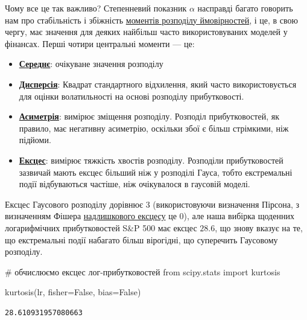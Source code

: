 \documentclass[
  letterpaper,
]{report}
\newenvironment{Shaded}{\begin{snugshade}}{\end{snugshade}}
\newcommand{\CommentTok}[1]{\textcolor[rgb]{0.37,0.37,0.37}{#1}}
\newcommand{\ImportTok}[1]{\textcolor[rgb]{0.00,0.46,0.62}{#1}}
\newcommand{\NormalTok}[1]{\textcolor[rgb]{0.00,0.23,0.31}{#1}}
\newcommand{\OperatorTok}[1]{\textcolor[rgb]{0.37,0.37,0.37}{#1}}
\newcommand{\VariableTok}[1]{\textcolor[rgb]{0.07,0.07,0.07}{#1}}
\providecommand{\tightlist}{%
  \setlength{\itemsep}{0pt}\setlength{\parskip}{0pt}}\usepackage{longtable,booktabs,array}
\begin{document}
Чому все це так важливо? Степенневий показник \(\alpha\) насправді
багато говорить нам про стабільність і збіжність
\href{https://en.wikipedia.org/wiki/Moment_(mathematics)}{моментів
розподілу ймовірностей}, і це, в свою чергу, має значення для деяких
найбільш часто використовуваних моделей у фінансах. Перші чотири
центральні моменти --- це:

\begin{itemize}
\tightlist
\item
  \textbf{\href{https://en.wikipedia.org/wiki/Expected_value}{Середнє}}:
  очікуване значення розподілу
\item
  \textbf{\href{https://en.wikipedia.org/wiki/Variance}{Дисперсія}}:
  Квадрат стандартного відхилення, який часто використовується для
  оцінки волатильності на основі розподілу прибутковості.
\item
  \textbf{\href{https://en.wikipedia.org/wiki/Skewness}{Асиметрія}}:
  вимірює зміщення розподілу. Розподіл прибутковостей, як правило, має
  негативну асиметрію, оскільки збої є більш стрімкими, ніж підйоми.
\item
  \textbf{\href{https://en.wikipedia.org/wiki/Kurtosis}{Ексцес}}:
  вимірює тяжкість хвостів розподілу. Розподіли прибутковостей зазвичай
  мають ексцес більший ніж у розподілі Гауса, тобто екстремальні події
  відбуваються частіше, ніж очікувалося в гаусовій моделі.
\end{itemize}

Ексцес Гаусового розподілу дорівнює 3 (використовуючи визначення
Пірсона, з визначенням Фішера
\href{https://en.wikipedia.org/wiki/Kurtosis\#Excess_kurtosis}{надлишкового
ексцесу} це 0), але наша вибірка щоденних логарифмічних прибутковостей
S\&P 500 має ексцес \(28.6\), що знову вказує на те, що екстремальні
події набагато більш вірогідні, що суперечить Гаусовому розподілу.

\begin{Shaded}
\begin{Highlighting}[]
\CommentTok{\# обчислюємо ексцес лог{-}прибутковостей}
\ImportTok{from}\NormalTok{ scipy.stats }\ImportTok{import}\NormalTok{ kurtosis}

\NormalTok{kurtosis(lr, fisher}\OperatorTok{=}\VariableTok{False}\NormalTok{, bias}\OperatorTok{=}\VariableTok{False}\NormalTok{)}
\end{Highlighting}
\end{Shaded}

\begin{verbatim}
28.610931957080663
\end{verbatim}
\end{document}
